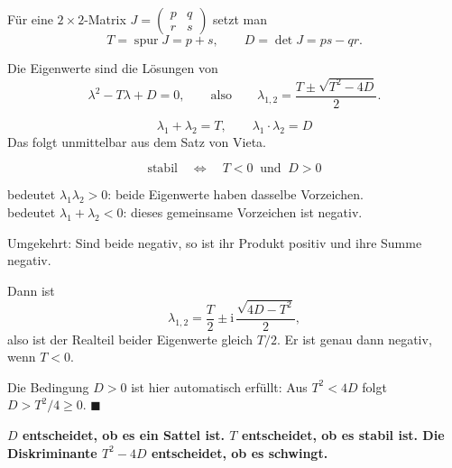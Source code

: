 \begin{merksatz}
Für eine $2\times2$-Matrix $J = \begin{pmatrix} p & q\\ r & s\end{pmatrix}$ setzt man
\[ T = \operatorname{spur} J = p + s, \qquad D = \det J = ps - qr . \]

Die Eigenwerte sind die Lösungen von
\[ \lambda^2 - T\lambda + D = 0 , \qquad\text{also}\qquad \lambda_{1,2} = \frac{T \pm \sqrt{T^2-4D}}{2} . \]

\[ \lambda_1 + \lambda_2 = T, \qquad \lambda_1\cdot\lambda_2 = D \]
Das folgt unmittelbar aus dem Satz von Vieta.

\begin{center}
\begin{minipage}{0.88\textwidth}
\end{minipage}
\end{center}
\end{merksatz}

\begin{merksatz}
\[ \text{stabil} \quad\Longleftrightarrow\quad T < 0 \ \text{ und } \ D > 0 \]

 bedeutet $\lambda_1\lambda_2 > 0$: beide Eigenwerte haben dasselbe Vorzeichen.\\
 bedeutet $\lambda_1+\lambda_2 < 0$: dieses gemeinsame Vorzeichen ist negativ.

Umgekehrt: Sind beide negativ, so ist ihr Produkt positiv und ihre Summe negativ.

Dann ist
\[ \lambda_{1,2} = \frac{T}{2} \pm \mathrm{i}\,\frac{\sqrt{4D-T^2}}{2} , \]
also ist der Realteil beider Eigenwerte gleich $T/2$. Er ist genau dann negativ, wenn $T < 0$.

Die Bedingung $D > 0$ ist hier automatisch erfüllt: Aus $T^2 < 4D$ folgt $D > T^2/4 \ge 0$. $\blacksquare$

\begin{center}
\begin{minipage}{0.9\textwidth}
\textbf{$D$ entscheidet, ob es ein Sattel ist. $T$ entscheidet, ob es stabil ist. Die Diskriminante $T^2-4D$ entscheidet, ob es schwingt.}
\end{minipage}
\end{center}
\end{merksatz}


